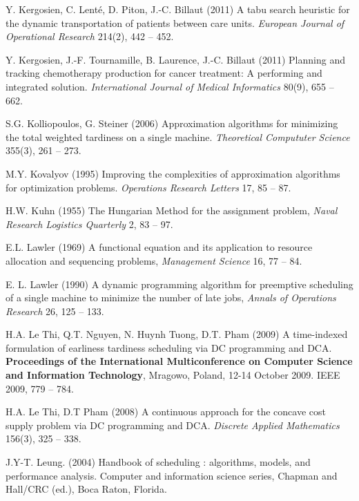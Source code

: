 \documentclass[11pt]{article}
\begin{document}
\begin{thebibliography}{19}
Y. Kergosien, C. Lenté, D. Piton, J.-C. Billaut (2011) 
A tabu search heuristic for the dynamic transportation of patients between care units. 
\textit{European Journal of Operational Research} 214(2), 442 -- 452. 

Y. Kergosien, J.-F. Tournamille, B. Laurence, J.-C. Billaut (2011) 
Planning and tracking chemotherapy production for cancer treatment: A performing and integrated solution. 
\textit{International Journal of Medical Informatics} 80(9), 655 -- 662.

S.G. Kolliopoulos, G. Steiner (2006) 
Approximation algorithms for minimizing the total weighted tardiness on a single machine. 
\textit{Theoretical Compututer Science} 355(3), 261 -- 273.
 
M.Y. Kovalyov (1995) 
Improving the complexities of approximation algorithms for optimization problems. 
\textit{Operations Research Letters} 17, 85 -- 87.

H.W. Kuhn (1955) 
The Hungarian Method for the assignment problem, 
\textit{Naval Research Logistics Quarterly} 2, 83 -- 97.

E.L. Lawler (1969) 
A functional equation and its application to resource allocation and sequencing problems, 
\textit{Management Science} 16, 77 -- 84.


E. L. Lawler (1990) 
A dynamic programming algorithm for preemptive scheduling of a single machine to minimize the number of late jobs, 
\textit{Annals of Operations Research} 26, 125 -- 133.

H.A. Le Thi, Q.T. Nguyen, N. Huynh Tuong, D.T. Pham (2009) 
A time-indexed formulation of earliness tardiness scheduling via DC programming and DCA. 
\textbf{Proceedings of the International Multiconference on Computer Science and Information Technology}, Mragowo, Poland, 12-14 October 2009. IEEE 2009, 779 -- 784.

H.A. Le Thi, D.T Pham (2008) 
A continuous approach for the concave cost supply problem via DC programming and DCA. 
\textit{Discrete Applied Mathematics} 156(3), 325 -- 338.

J.Y-T. Leung. (2004) 
Handbook of scheduling : algorithms, models, and performance analysis. Computer and information science series, Chapman and Hall/CRC (ed.), Boca Raton, Florida.


\end{thebibliography}
\end{document}
